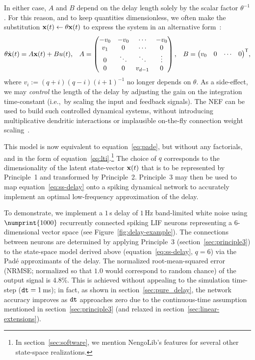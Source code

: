 In either case, $A$ and $B$ depend on the delay length solely by the scalar factor $\theta^{-1}$.
For this reason, and to keep quantities dimensionless, we often make the substitution $\mathbf{x}(t) \leftarrow \theta\mathbf{x}(t)$ to express the system in an alternative form~\citep{braindrop2019}:
\begin{equation} \label{eq:delay-system}
  \theta \dot{\mathbf{x}}(t) = A\mathbf{x}(t) + Bu(t) \text{,} \quad
  A = \begin{pmatrix} -v_0 & -v_0 & \cdots & -v_0 \\ v_1 & 0 & \cdots & 0 \\ 0 & \ddots & \ddots & \vdots \\ 0 & 0 & v_{d-1} & 0\end{pmatrix} \text{,} \quad 
  B = {\begin{pmatrix} v_0 & 0 & \cdots & 0\end{pmatrix}}^\mathsf{T} \text{,} 
\end{equation}
where $v_i := (q+i)(q-i)(i+1)^{-1}$ no longer depends on $\theta$. %
As a side-effect, we may \emph{control} the length of the delay by adjusting the gain on the integration time-constant (i.e.,~by scaling the input and feedback signals).
The NEF can be used to build such controlled dynamical systems, without introducing multiplicative dendritic interactions or implausible on-the-fly connection weight scaling~\citep{eliasmith2000b}.

This model is now equivalent to equation~\ref{eq:pade}, but without any factorials, and in the form of equation~\ref{eq:lti}.\footnote{%
In section~\ref{sec:software}, we mention NengoLib's features for several other state-space realizations.}
The choice of $q$ corresponds to the dimensionality of the latent state-vector $\mathbf{x}(t)$ that is to be represented by Principle~1 and transformed by Principle~2.
Principle~3 may then be used to map equation~\ref{eq:ss-delay} onto a spiking dynamical network to accurately implement an optimal low-frequency approximation of the delay.

To demonstrate, we implement a $1$\,s delay of $1\,$Hz band-limited white noise using $\numprint{1000}$ recurrently connected spiking LIF neurons representing a $6$-dimensional vector space (see Figure~\ref{fig:delay-example}).
The connections between neurons are determined by applying Principle~3 (section~\ref{sec:principle3}) to the state-space model derived above (equation~\ref{eq:ss-delay}, $q=6$) via the Pad\'e approximants of the delay.
The normalized root-mean-squared error (NRMSE; normalized so that $1.0$ would correspond to random chance) of the output signal is $4.8$\%.
This is achieved without appealing to the simulation time-step ($\texttt{dt}{} = 1$\,ms); in fact, as shown in section~\ref{sec:pure_delay}, the network accuracy improves as $\texttt{dt}{}$ approaches zero due to the continuous-time assumption mentioned in section~\ref{sec:principle3} (and relaxed in section~\ref{sec:linear-extensions}).


